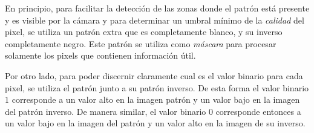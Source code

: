 En principio, para facilitar la detección de las zonas donde el patrón está presente y es visible por la cámara y para determinar un umbral mínimo de la \emph{calidad} del pixel, se utiliza un patrón extra que es completamente blanco, y su inverso completamente negro. Este patrón se utiliza como \emph{máscara} para procesar solamente los pixels que contienen información útil.

Por otro lado, para poder discernir claramente cual es el valor binario para cada pixel, se utiliza el patrón junto a su patrón inverso. De esta forma el valor binario $1$ corresponde a un valor alto en la imagen patrón y un valor bajo en la imagen del patrón inverso. De manera similar, el valor binario $0$ corresponde entonces a un valor bajo en la imagen del patrón y un valor alto en la imagen de su inverso. 





